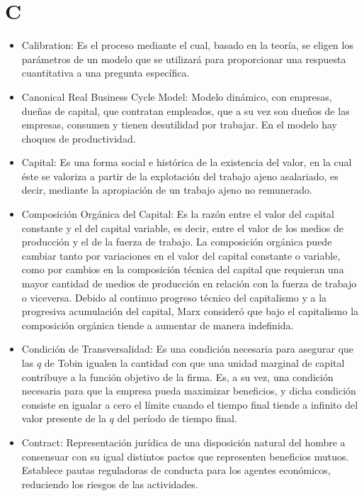 \documentclass{article}
\begin{document}
\section{C}
\begin{itemize}

\item Calibration: Es el proceso mediante el cual, basado en la teoría, se eligen los parámetros de un modelo que se utilizará para proporcionar una respuesta cuantitativa a una pregunta específica. 

\item Canonical Real Business Cycle Model: Modelo dinámico, con empresas, dueñas de capital, que contratan empleados, que a su vez son dueños de las empresas, consumen y tienen desutilidad por trabajar. En el modelo hay choques de productividad.

\item Capital: Es una forma social e histórica de la existencia del valor, en la cual éste se valoriza a partir de la explotación del trabajo ajeno asalariado, es decir, mediante la apropiación de un trabajo ajeno no remunerado. 

\item Composición Orgánica del Capital: Es la razón entre el valor del capital constante y el del capital variable, es decir, entre el valor de los medios de producción y el de la fuerza de trabajo. La composición orgánica puede cambiar tanto por variaciones en el valor del capital constante o variable, como por cambios en la composición técnica del capital que requieran una mayor cantidad de medios de producción en relación con la fuerza de trabajo o viceversa. Debido al continuo progreso técnico del capitalismo y a la progresiva acumulación del capital, Marx consideró que bajo el capitalismo la composición orgánica tiende a aumentar de manera indefinida. 

\item Condición de Transversalidad: Es una condición necesaria para asegurar que las $q$ de Tobin igualen la cantidad con que una unidad marginal de capital contribuye a la función objetivo de la firma. Es, a su vez, una condición necesaria para que la empresa pueda maximizar beneficios, y dicha condición consiste en igualar a cero el límite cuando el tiempo final tiende a infinito del valor presente de la $q$ del período de tiempo final. 

\item Contract: Representación jurídica de una disposición natural del hombre a consensuar con su igual distintos pactos que representen beneficios mutuos. Establece pautas reguladoras de conducta para los agentes económicos, reduciendo los riesgos de las actividades.


\end{itemize}
\end{document}
